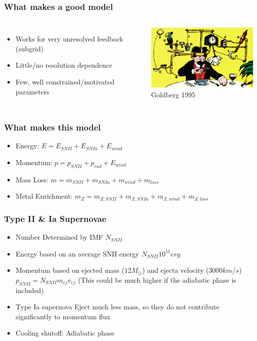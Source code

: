 \documentclass[serif,mathserif]{beamer}
\begin{document}
\begin{frame}
	\frametitle{What makes a good model}
	\begin{columns}[c]
		\begin{itemize}
			\item Works for very unresolved feedback (subgrid)
			\item Little/no resolution dependence
			\item Few, well constrained/motivated parameters
		\end{itemize}
			\includegraphics[width=6cm]{figures/rube}\\
			\tiny{Goldberg 1995}
	\end{columns}
\end{frame}

\begin{frame}
	\frametitle{What makes this model}
	\begin{itemize}
		\item Energy: $E = E_{SNII}+E_{SNIa}+E_{wind}$
		\item Momentum: $p = p_{SNII}+p_{rad}+E_{wind}$
		\item Mass Loss: $m = m_{SNII}+m_{SNIa}+m_{wind}+m_{loss}$
		\item Metal Enrichment: $m_Z = m_{Z,SNII}+m_{Z,SNIa}+m_{Z,wind}+m_{Z,loss}$
	\end{itemize}
\end{frame}

\begin{frame}
	\frametitle{Type II \& Ia Supernovae}
	\begin{itemize}
		\item Number Determined by IMF $N_{SNII}$ 
		\item Energy based on an average SNII energy $N_{SNII}10^{51}erg$ 
		\item Momentum based on ejected mass ($12 M_\odot$) and ejecta 
			velocity ($3000 km/s$)\\$p_{SNII} =
			N_{SNII}m_{ej}v_{ej}$ (This could be much higher if the adiabatic
			phase is included)
		\item Type Ia supernova Eject much less mass, so they do not contribute
			significantly to momentum flux
		\item Cooling shutoff: Adiabatic phase
	\end{itemize}
\end{frame}
\end{document}
